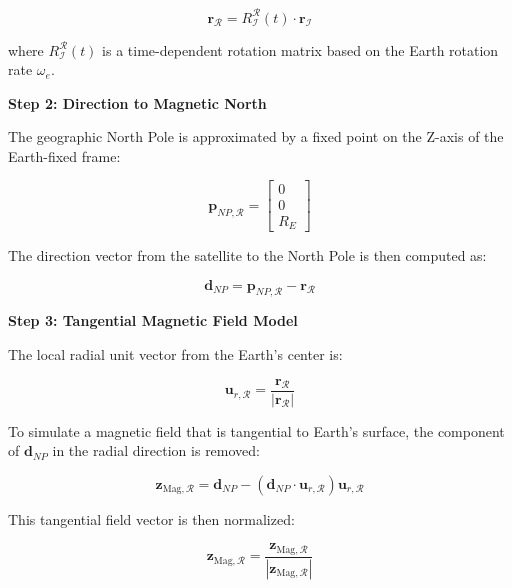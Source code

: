 \begin{equation}
    \mathbf{r}_{\mathcal{R}} = R_{\mathcal{I}}^{\mathcal{R}}(t) \cdot \mathbf{r}_{\mathcal{I}}
\end{equation}

where $R_{\mathcal{I}}^{\mathcal{R}}(t)$ is a time-dependent rotation matrix based on the Earth rotation rate $\omega_e$.

\textbf{Step 2: Direction to Magnetic North}

The geographic North Pole is approximated by a fixed point on the Z-axis of the Earth-fixed frame:

\begin{equation}
    \mathbf{p}_{NP,\mathcal{R}} = \begin{bmatrix} 0 \\ 0 \\ R_E \end{bmatrix}
\end{equation}

The direction vector from the satellite to the North Pole is then computed as:

\begin{equation}
    \mathbf{d}_{NP} = \mathbf{p}_{NP,\mathcal{R}} - \mathbf{r}_{\mathcal{R}}
\end{equation}

\textbf{Step 3: Tangential Magnetic Field Model}

The local radial unit vector from the Earth's center is:

\begin{equation}
    \mathbf{u}_{r,\mathcal{R}} = \frac{\mathbf{r}_{\mathcal{R}}}{|\mathbf{r}_{\mathcal{R}}|}
\end{equation}

To simulate a magnetic field that is tangential to Earth's surface, the component of $\mathbf{d}_{NP}$ in the radial direction is removed:

\begin{equation}
    \mathbf{z}_{\text{Mag},\mathcal{R}} = \mathbf{d}_{NP} - (\mathbf{d}_{NP} \cdot \mathbf{u}_{r,\mathcal{R}})\mathbf{u}_{r,\mathcal{R}}
\end{equation}

This tangential field vector is then normalized:

\begin{equation}
    \mathbf{z}_{\text{Mag},\mathcal{R}} = \frac{\mathbf{z}_{\text{Mag},\mathcal{R}}}{|\mathbf{z}_{\text{Mag},\mathcal{R}}|}
\end{equation}


